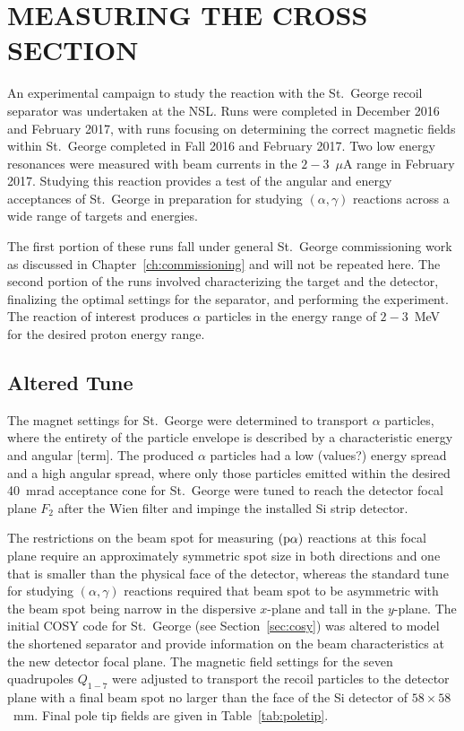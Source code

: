 \chapter{MEASURING THE \alpa{} CROSS SECTION}


An experimental campaign to study the \alpa{} reaction with the St.\ George
recoil separator was undertaken at the NSL. Runs were completed in December
2016 and February 2017, with runs focusing on determining the correct magnetic
fields within St.\ George completed in Fall 2016 and February 2017. Two low
energy resonances were measured with beam currents in the $2-3$~$\mu$A range in
February 2017. Studying this reaction provides a test of the angular and energy
acceptances of St.\ George in preparation for studying $(\alpha,\gamma)$
reactions across a wide range of targets and energies.

The first portion of these runs fall under general St.\ George
commissioning work as discussed in Chapter~\ref{ch:commissioning} and will not
be repeated here. The second portion of the runs involved characterizing the
target and the detector, finalizing the optimal settings for the separator, and
performing the experiment. The reaction of interest produces $\alpha$ particles
in the energy range of $2-3$~MeV for the desired proton energy range.


\section{Altered Tune}

The magnet settings for St.\ George were determined to transport $\alpha$
particles, where the entirety of the particle envelope is described by a
characteristic energy and angular [term]. The produced $\alpha$ particles had
a low (values?) energy spread and a high angular spread, where only those
particles emitted within the desired 40~mrad acceptance cone for St.\ George
were tuned to reach the detector focal plane $F_2$ after the Wien filter and
impinge the installed Si strip detector.

The restrictions on the beam spot for measuring $(\rm{p}\alpha)$ reactions
at this focal plane require an approximately symmetric spot size in both
directions and one that
is smaller than the physical face of the detector, whereas the standard tune
for studying $(\alpha,\gamma)$ reactions required that beam spot to be
asymmetric with the beam spot being narrow in the dispersive $x$-plane and
tall in the $y$-plane. The initial COSY code for St.\ George
(see Section~\ref{sec:cosy}) was altered
to model the shortened separator and provide information on the beam
characteristics at the new detector focal plane. The magnetic field settings
for the seven quadrupoles $Q_{1-7}$ were adjusted to transport the recoil
particles to the detector plane with a final beam spot no larger than the face
of the Si detector of $58\times 58$~mm. Final pole tip fields are given in
Table~\ref{tab:poletip}.

